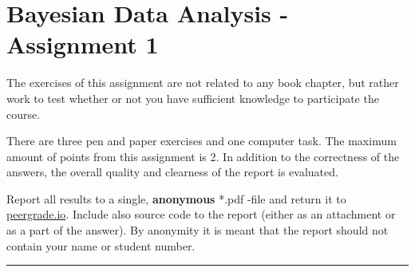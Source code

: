 \documentclass[11pt,a4paper,english]{article}
\newcommand{\HRule}{\rule{\linewidth}{0.5mm}}
\begin{document}
\section*{Bayesian Data Analysis - Assignment 1}


The exercises of this assignment are not related to any book chapter, but rather work to test whether or not you have sufficient knowledge to participate the course.

There are three pen and paper exercises and one computer task. The maximum amount of points from this assignment is 2. In addition to the correctness of the answers, the overall quality and clearness of the report is evaluated.

Report all results to a single, {\bf anonymous} *.pdf -file and return it to \href{peergrade.io}{peergrade.io}. Include also source code to the report (either as an attachment or as a part of the answer). By anonymity it is meant that the report should not contain your name or student number.



\HRule
\end{document}
